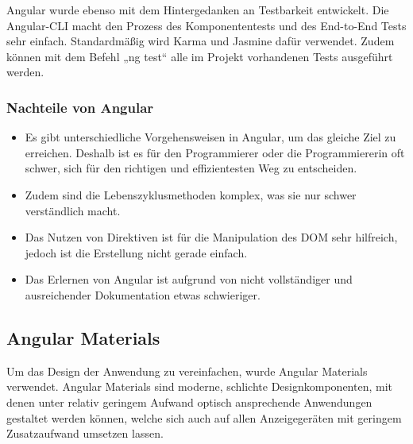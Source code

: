 Angular wurde ebenso mit dem Hintergedanken an Testbarkeit entwickelt. Die Angular-CLI macht den Prozess des Komponententests und des End-to-End Tests sehr einfach. Standardmäßig wird Karma und Jasmine dafür verwendet. Zudem können mit dem Befehl „ng test“ alle im Projekt vorhandenen Tests ausgeführt werden.

\cite{VorteileAngular}

\subsubsection{Nachteile von Angular}
\begin{itemize}
  \item Es gibt unterschiedliche Vorgehensweisen in Angular, um das gleiche Ziel zu erreichen. Deshalb ist es für den Programmierer oder die Programmiererin oft schwer, sich für den richtigen und effizientesten Weg zu entscheiden.
  \item Zudem sind die Lebenszyklusmethoden komplex, was sie nur schwer verständlich macht.
  \item Das Nutzen von Direktiven ist für die Manipulation des DOM sehr hilfreich, jedoch ist die Erstellung nicht gerade einfach.
  \item Das Erlernen von Angular ist aufgrund von nicht vollständiger und ausreichender Dokumentation etwas schwieriger.
\end{itemize}
\cite{NachteileAngular}

\subsection{Angular Materials}
Um das Design der Anwendung zu vereinfachen, wurde Angular Materials verwendet. Angular Materials sind moderne, schlichte Designkomponenten, mit denen unter relativ geringem Aufwand optisch ansprechende Anwendungen gestaltet werden können, welche sich auch auf allen Anzeigegeräten mit geringem Zusatzaufwand umsetzen lassen. \cite{AngularMaterials}

